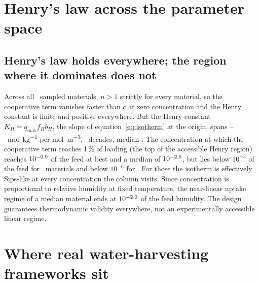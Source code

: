 \section{Henry's law across the parameter space}
\label{s2:sec1}

\subsection{Henry's law holds everywhere; the region where it dominates does not}

Across all \nIsoNmat\ sampled materials, \(n > 1\) strictly for every material, so the cooperative term
vanishes faster than \(c\) at zero concentration and the Henry constant is finite and positive everywhere.
But the Henry constant \(K_H = q_{\max} f_H b_H\), the slope of
equation~\eqref{eq:isotherm} at the origin, spans \nIsoKHmin--\nIsoKHmax\ \si{\mole\per\kilo\gram} per
\si{\mole\per\metre\cubed}, \nIsoKHdec\ decades, median \nIsoKHmed. The
concentration at which the cooperative term reaches 1\,\% of loading (the top of
the accessible Henry region) reaches \(10^{-0.9}\) of the feed at best
and a median of \(10^{-2.0}\), but lies below \(10^{-3}\) of the feed for
\nIsoHenryBelowMilli\ materials and below \(10^{-6}\) for \nIsoHenryBelowMicro. For
those the isotherm is effectively Sips-like at every concentration the column
visits. Since concentration is proportional to relative humidity at fixed
temperature, the near-linear uptake regime of a median material ends at
\(10^{-2.0}\) of the feed humidity. The design guarantees thermodynamic validity
everywhere, not an experimentally accessible linear regime.

\section{Where real water-harvesting frameworks sit}
\label{s2:sec2}

